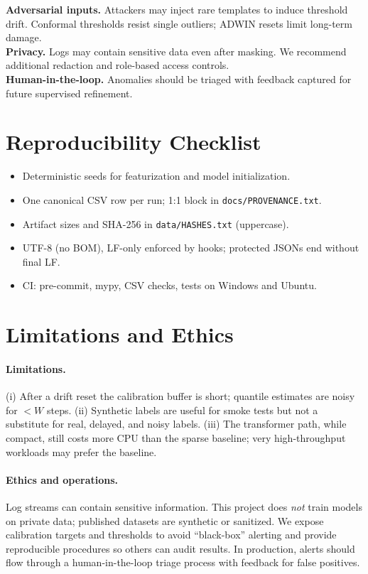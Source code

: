 \documentclass[10pt,twocolumn]{article}
\begin{document}
\textbf{Adversarial inputs.} Attackers may inject rare templates to induce threshold drift. Conformal thresholds resist single outliers; ADWIN resets limit long-term damage. \\
\textbf{Privacy.} Logs may contain sensitive data even after masking. We recommend additional redaction and role-based access controls. \\
\textbf{Human-in-the-loop.} Anomalies should be triaged with feedback captured for future supervised refinement.

\section{Reproducibility Checklist}
\begin{itemize}[leftmargin=*]
  \item Deterministic seeds for featurization and model initialization.
  \item One canonical CSV row per run; 1:1 block in \texttt{docs/PROVENANCE.txt}.
  \item Artifact sizes and SHA-256 in \texttt{data/HASHES.txt} (uppercase).
  \item UTF-8 (no BOM), LF-only enforced by hooks; protected JSONs end without final LF.
  \item CI: pre-commit, mypy, CSV checks, tests on Windows and Ubuntu.
\end{itemize}

\section{Limitations and Ethics}

\paragraph{Limitations.} (i) After a drift reset the calibration buffer is short; quantile estimates are noisy for $<\!W$ steps. (ii) Synthetic labels are useful for smoke tests but not a substitute for real, delayed, and noisy labels. (iii) The transformer path, while compact, still costs more CPU than the sparse baseline; very high-throughput workloads may prefer the baseline.

\paragraph{Ethics and operations.} Log streams can contain sensitive information. This project does \emph{not} train models on private data; published datasets are synthetic or sanitized. We expose calibration targets and thresholds to avoid ``black-box'' alerting and provide reproducible procedures so others can audit results. In production, alerts should flow through a human-in-the-loop triage process with feedback for false positives.
\end{document}
